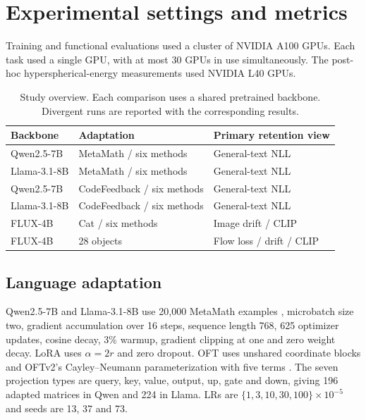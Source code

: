 \section{Experimental settings and metrics}\label{app:settings}
Training and functional evaluations used a cluster of NVIDIA A100 GPUs. Each task used a single GPU, with at most 30 GPUs in use simultaneously. The post-hoc hyperspherical-energy measurements used NVIDIA L40 GPUs.

\begin{table}[!htbp]
\caption{Study overview. Each comparison uses a shared pretrained backbone. Divergent runs are reported with the corresponding results.}
\label{tab:studies}
\begin{center}
\setlength{\tabcolsep}{3pt}
\begin{tabular*}{\linewidth}{@{\extracolsep{\fill}}lll@{}}\toprule
Backbone & Adaptation & Primary retention view \\\midrule
Qwen2.5-7B & MetaMath / six methods & General-text NLL \\
Llama-3.1-8B & MetaMath / six methods & General-text NLL \\
Qwen2.5-7B & CodeFeedback / six methods & General-text NLL \\
Llama-3.1-8B & CodeFeedback / six methods & General-text NLL \\
FLUX-4B & Cat / six methods & Image drift / CLIP \\
FLUX-4B & 28 objects & Flow loss / drift / CLIP \\\bottomrule
\end{tabular*}
\end{center}
\end{table}

\subsection{Language adaptation}
Qwen2.5-7B and Llama-3.1-8B use 20,000 MetaMath examples \citep{yu2024metamath}, microbatch size two, gradient accumulation over 16 steps, sequence length 768, 625 optimizer updates, cosine decay, 3\% warmup, gradient clipping at one and zero weight decay. LoRA uses $\alpha=2r$ and zero dropout. OFT uses unshared coordinate blocks and OFTv2's Cayley--Neumann parameterization with five terms \citep{qiu2025oftv2}. The seven projection types are query, key, value, output, up, gate and down, giving 196 adapted matrices in Qwen and 224 in Llama. LRs are $\{1,3,10,30,100\}\times10^{-5}$ and seeds are 13, 37 and 73. 

